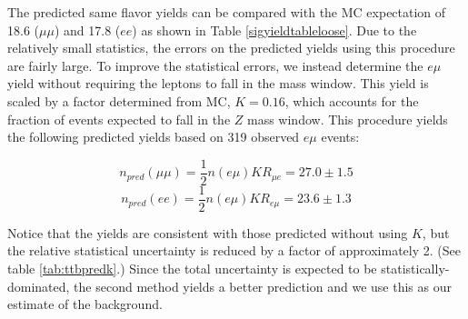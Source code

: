 The predicted same flavor \ttbar yields 
can be compared 
with the MC expectation of 
18.6 %
($\mu\mu$) and 
17.8 %
($ee$) as shown in Table \ref{sigyieldtableloose}.
Due to the relatively small statistics, the errors on the predicted yields 
using this procedure are fairly large.
To improve the statistical errors, we instead determine the $e\mu$ yield
without requiring the leptons to fall in the \Z mass window. 
This yield is scaled by a factor determined from MC, $K= 0.16$, %
which accounts for the fraction of \ttbar events expected to fall in the $Z$ mass
window. This procedure yields the following
predicted yields based on 
319 %
observed $e\mu$ events: %

\begin{equation}
n_{pred}(\mu\mu) = \frac{1}{2}n(e\mu)KR_{\mu e} = 27.0 \pm 1.5 %
\end{equation}
\begin{equation}
n_{pred}(ee)     = \frac{1}{2}n(e\mu)KR_{e\mu} = 23.6 \pm 1.3 %
\end{equation}

Notice that the yields are consistent with those predicted without using $K$, but the relative statistical uncertainty is reduced by a factor of approximately 2. (See table \ref{tab:ttbpredk}.)
Since the total uncertainty is expected to be statistically-dominated, the second method yields a better prediction and we use this as our estimate
of the \ttbar background. 



